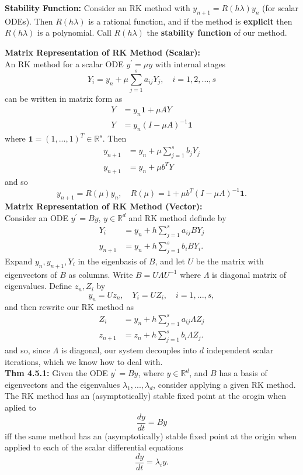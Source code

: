 \documentclass[10pt,a4paper]{article}
\newcommand{\R}{\mathbb{R}}
\begin{document}
\begin{multicols*}{2}
\textbf{Stability Function:} Consider an RK method with $y_{n+1} = R(h\lambda)y_n$ (for scalar ODEs). Then $R(h\lambda)$ is a rational function, and if the method is \textbf{explicit} then $R(h\lambda)$ is a polynomial. Call $R(h\lambda)$ the \textbf{stability function} of our method.

\textbf{Matrix Representation of RK Method (Scalar):}\\
 An RK method for a scalar ODE $y^\prime = \mu y$ with internal stages 
\[
Y_i = y_n + \mu\sum_{j=1}^s a_{ij}Y_j, \quad i = 1,2,...,s    
\]
can be written in matrix form as
\begin{align*}
    Y &= y_n \mathbf{1} + \mu A Y \\
    Y &= y_n(I - \mu A)^{-1}\mathbf{1}     
\end{align*}
where $\mathbf{1} = (1,...,1)^T \in \R^s$. Then
\begin{align*}
    y_{n+1} &= y_n + \mu \sum_{j=1}^s b_j Y_j\\
    y_{n+1} &= y_n + \mu b^T Y 
\end{align*}
and so 
\[
y_{n+1} = R(\mu)y_n, \quad R(\mu) = 1 + \mu b^T(I - \mu A)^{-1}\mathbf{1}.  
\]
\textbf{Matrix Representation of RK Method (Vector):}\\
Consider an ODE $y^\prime = By$, $y \in \R^d$ and RK method definde by
\begin{align*}
    Y_i     &= y_n + h\sum_{j=1}^s a_{ij}BY_j \\
    y_{n+1} &= y_n + h\sum_{j=1}^s b_iBY_i.
\end{align*}
Expand $y_n, y_{n+1}, Y_i$ in the eigenbasis of $B$, and let $U$ be the matrix with eigenvectors of $B$ as columns. Write $B = U\Lambda U^{-1}$ where $\Lambda$ is diagonal matrix of eigenvalues. Define $z_n, Z_i$ by 
\[
y_n = Uz_n, \quad Y_i = UZ_i, \quad i = 1,...,s,    
\]
and then rewrite our RK method as 
\begin{align*}
    Z_i     &= y_n + h\sum_{j=1}^s a_{ij}\Lambda Z_j \\
    z_{n+1} &= z_n + h\sum_{j=1}^s b_i\Lambda Z_j.
\end{align*}
and so, since $\Lambda$ is diagonal, our system decouples into $d$ independent scalar iterations, which we know how to deal with.\\

\textbf{Thm 4.5.1:} Given the ODE $y^\prime = By$, where $y \in \R^d$, and $B$ has a basis of eigenvectors and the eigenvalues $\lambda_1, ..., \lambda_d$, consider applying a given RK method. The RK method has an (asymptotically) stable fixed point at the orogin when aplied to 
\[
\frac{dy}{dt} = By    
\]
iff the same method has an (asymptotically) stable fixed point at the origin when applied to each of the scalar differential equations 
\[
\frac{dy}{dt} = \lambda_i y. 
\]


\end{multicols*}
\end{document}
